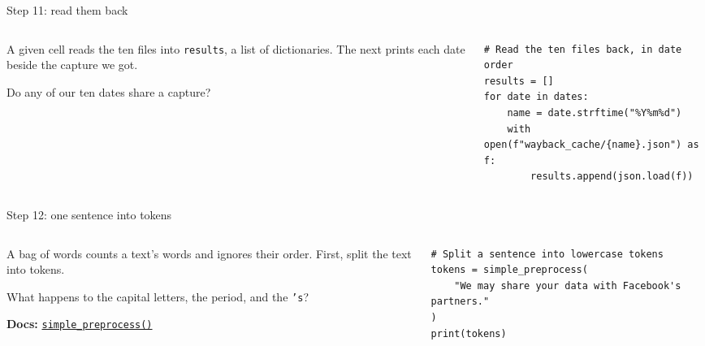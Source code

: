 \documentclass[9pt,aspectratio=169]{beamer}
\begin{document}
\begin{frame}[fragile]{Step 11: read them back}
    \begin{columns}[T]
        \begin{column}{0.37\textwidth}
            A given cell reads the ten files into \texttt{results}, a list of dictionaries. The next prints each date beside the capture we got.

            \medskip
            Do any of our ten dates share a capture?
        \end{column}
        \begin{column}{0.6\textwidth}
\begin{lstlisting}
# Read the ten files back, in date order
results = []
for date in dates:
    name = date.strftime("%Y%m%d")
    with open(f"wayback_cache/{name}.json") as f:
        results.append(json.load(f))
\end{lstlisting}
        \end{column}
    \end{columns}
\end{frame}

\begin{frame}[fragile]{Step 12: one sentence into tokens}
    \begin{columns}[T]
        \begin{column}{0.37\textwidth}
            A bag of words counts a text's words and ignores their order. First, split the text into tokens.

            \medskip
            What happens to the capital letters, the period, and the \texttt{'s}?

            \medskip
            {\scriptsize\textbf{Docs:} \href{https://radimrehurek.com/gensim/utils.html\#gensim.utils.simple_preprocess}{\texttt{simple\_preprocess()}}\par}
        \end{column}
        \begin{column}{0.6\textwidth}
\begin{lstlisting}
# Split a sentence into lowercase tokens
tokens = simple_preprocess(
    "We may share your data with Facebook's partners."
)
print(tokens)
\end{lstlisting}
        \end{column}
    \end{columns}
\end{frame}
\end{document}
